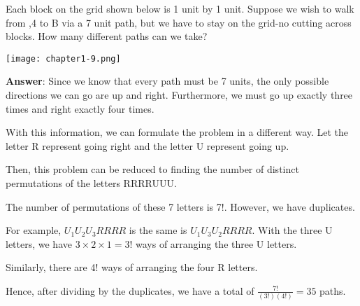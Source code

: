 \documentclass[12pt]{article}
\newenvironment{exercise}[2][Exercise]{\begin{trivlist}
\item[\hskip \labelsep {\bfseries #1}\hskip \labelsep {\bfseries #2.}]}{\end{trivlist}}
\begin{document}
\begin{exercise}{1.9}
Each block on the grid shown below is 1 unit by 1 unit.
Suppose we wish to walk from ,4 to B via a 7 unit path, but we have to stay on the grid-no cutting across blocks. How many different paths can we take?

\texttt{[image: chapter1-9.png]}

\textbf{Answer}: Since we know that every path must be 7 units, the only possible directions we can go are up and right. Furthermore, we must go up exactly three times and right exactly four times.

With this information, we can formulate the problem in a different way. Let the letter R represent going right and the letter U represent going up. 

Then, this problem can be reduced to finding the number of distinct permutations of the letters RRRRUUU.

The number of permutations of these 7 letters is 7!. However, we have duplicates.

For example, $U_1U_2U_3RRRR$ is the same is $U_1U_3U_2RRRR$. With the three U letters, we have $3 \times 2 \times 1 = 3!$ ways of arranging the three U letters. 

Similarly, there are 4! ways of arranging the four R letters.


Hence, after dividing by the duplicates, we have a total of $\frac{7!}{(3!)(4!)} = \boxed{35}$ paths.

\end{exercise}




 
\end{document}
